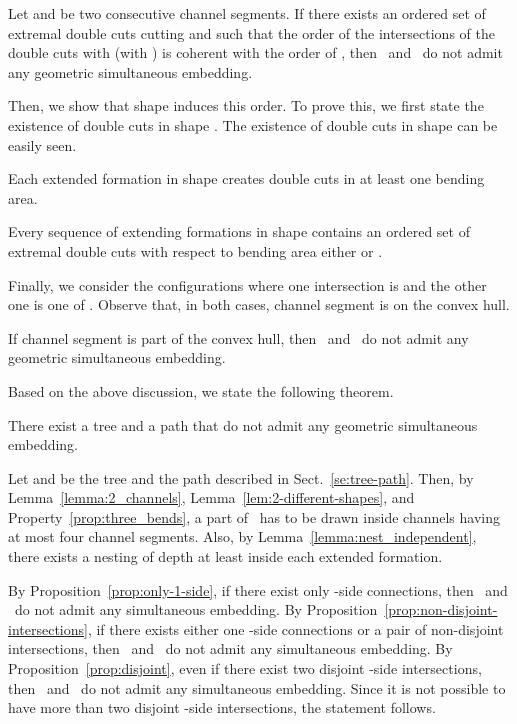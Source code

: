 \documentclass[a4paper,10pt]{llncs}
\newcounter{prop}
\renewenvironment{proof}
{{\bf Proof:}}{\hspace*{\fill}\par\vspace{2mm}}
\newcommand{\T}{\mbox{ }}
\renewcommand{\P}{\mbox{ }}
\begin{document}
\begin{lemma}\label{lemma:no-ordered-double-cuts}
Let  and  be two consecutive channel segments. If there exists an ordered set  of extremal double cuts cutting  and  such that the order of the intersections of the double cuts with  (with ) is coherent with the order of , then \T and \P do not admit any geometric simultaneous embedding.
\end{lemma}

Then, we show that shape   induces this order. To prove this, we first state the existence of double cuts in shape  . The existence of double cuts in shape   can be easily seen.

\begin{lemma}\label{lem:double_cuts_13}
Each extended formation in shape   creates double cuts in at least one bending area.
\end{lemma}

\begin{lemma}\label{lem:ordered-set-of-double-cuts-exists}
Every sequence of extending formations in shape   contains an ordered set  of extremal double cuts with respect to bending area either  or .
\end{lemma}

Finally, we consider the configurations where one intersection is  and the other one is one of . Observe that, in both cases, channel segment  is on the convex hull.

\begin{lemma}\label{lem:cs_two_convex_hull}
If channel segment  is part of the convex hull, then \T and \P do not admit any geometric simultaneous embedding.
\end{lemma}

Based on the above discussion, we state the following theorem.

\begin{theorem}
There exist a tree and a path that do not admit any geometric simultaneous embedding.
\end{theorem}
\begin{proof}
Let  and  be the tree and the path described in Sect.~\ref{se:tree-path}. Then, by Lemma~\ref{lemma:2_channels}, Lemma~\ref{lem:2-different-shapes}, and Property~\ref{prop:three_bends}, a part of \T has to be drawn inside channels having at most four channel segments. Also, by Lemma~\ref{lemma:nest_independent}, there exists a nesting of depth at least  inside each extended formation.

By Proposition~\ref{prop:only-1-side}, if there exist only -side connections, then \T and \P do not admit any simultaneous embedding. By Proposition~\ref{prop:non-disjoint-intersections}, if there exists either one -side connections or a pair of non-disjoint intersections, then \T and \P do not admit any simultaneous embedding. By Proposition~\ref{prop:disjoint}, even if there exist two disjoint -side intersections, then \T and \P do not admit any simultaneous embedding. Since it is not possible to have more than two disjoint -side intersections, the statement follows.
\end{proof}
\end{document}
